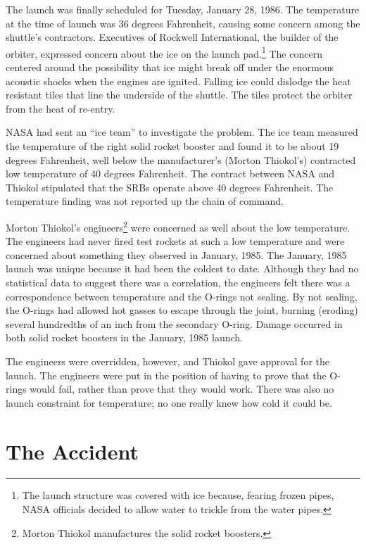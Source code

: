 The launch was finally scheduled for Tuesday, January 28, 1986. The temperature at the time of launch was 36 degrees Fahrenheit, causing some concern among the shuttle's contractors. Executives of Rockwell International, the builder of the orbiter, expressed concern about the ice on the launch pad.\footnote{The launch structure was covered with ice because, fearing frozen pipes, NASA officials decided to allow water to trickle from the water pipes.} The concern centered around the possibility that ice might break off under the enormous acoustic shocks when the engines are ignited. Falling ice could dislodge the heat resistant tiles that line the underside of the shuttle. The tiles protect the orbiter from the heat of re-entry.

NASA had sent an ``ice team'' to investigate the problem. The ice team measured the temperature of the right solid rocket booster and found it to be about 19 degrees Fahrenheit, well below the manufacturer's (Morton Thiokol's) contracted low temperature of 40 degrees Fahrenheit. The contract between NASA and Thiokol stipulated that the SRBs operate above 40 degrees Fahrenheit. The temperature finding was not reported up the chain of command.

Morton Thiokol's engineers\footnote{Morton Thiokol manufactures the solid rocket boosters.} were concerned as well about the low temperature. The engineers had never fired test rockets at such a low temperature and were concerned about something they observed in January, 1985. The January, 1985 launch was unique because it had been the coldest to date. Although they had no statistical data to suggest there was a correlation, the engineers felt there was a correspondence between temperature and the O-rings not sealing. By not sealing, the O-rings had allowed hot gasses to escape through the joint, burning (eroding) several hundredths of an inch from the secondary O-ring. Damage occurred in both solid rocket boosters in the January, 1985 launch.

The engineers were overridden, however, and Thiokol gave approval for the launch. The engineers were put in the position of having to prove that the O-rings would fail, rather than prove that they would work. There was also no launch constraint for temperature; no one really knew how cold it could be.

\section{The Accident}

